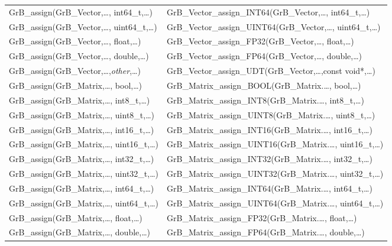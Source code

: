\begin{table}[htb]
{\begin{tabular}{l|l}
{\sf GrB\_assign(GrB\_Vector,\ldots, int64\_t,\ldots)}		& {\sf GrB\_Vector\_assign\_INT64(GrB\_Vector,\ldots, int64\_t,\ldots)} \\
{\sf GrB\_assign(GrB\_Vector,\ldots, uint64\_t,\ldots)}		& {\sf GrB\_Vector\_assign\_UINT64(GrB\_Vector,\ldots, uint64\_t,\ldots)} \\
{\sf GrB\_assign(GrB\_Vector,\ldots, float,\ldots)}		& {\sf GrB\_Vector\_assign\_FP32(GrB\_Vector,\ldots, float,\ldots)} \\
{\sf GrB\_assign(GrB\_Vector,\ldots, double,\ldots)}		& {\sf GrB\_Vector\_assign\_FP64(GrB\_Vector,\ldots, double,\ldots)} \\
{\sf GrB\_assign(GrB\_Vector,\ldots,\emph{other},\ldots)}	& {\sf GrB\_Vector\_assign\_UDT(GrB\_Vector,\ldots,const void*,\ldots)} \\ \hline
{\sf GrB\_assign(GrB\_Matrix,\ldots, bool,\ldots)}		& {\sf GrB\_Matrix\_assign\_BOOL(GrB\_Matrix.\ldots, bool,\ldots)} \\
{\sf GrB\_assign(GrB\_Matrix,\ldots, int8\_t,\ldots)}		& {\sf GrB\_Matrix\_assign\_INT8(GrB\_Matrix.\ldots, int8\_t,\ldots)} \\
{\sf GrB\_assign(GrB\_Matrix,\ldots, uint8\_t,\ldots)}		& {\sf GrB\_Matrix\_assign\_UINT8(GrB\_Matrix.\ldots, uint8\_t,\ldots)} \\
{\sf GrB\_assign(GrB\_Matrix,\ldots, int16\_t,\ldots)}		& {\sf GrB\_Matrix\_assign\_INT16(GrB\_Matrix.\ldots, int16\_t,\ldots)} \\
{\sf GrB\_assign(GrB\_Matrix,\ldots, uint16\_t,\ldots)}		& {\sf GrB\_Matrix\_assign\_UINT16(GrB\_Matrix.\ldots, uint16\_t,\ldots)} \\
{\sf GrB\_assign(GrB\_Matrix,\ldots, int32\_t,\ldots)}		& {\sf GrB\_Matrix\_assign\_INT32(GrB\_Matrix.\ldots, int32\_t,\ldots)} \\
{\sf GrB\_assign(GrB\_Matrix,\ldots, uint32\_t,\ldots)}		& {\sf GrB\_Matrix\_assign\_UINT32(GrB\_Matrix.\ldots, uint32\_t,\ldots)} \\
{\sf GrB\_assign(GrB\_Matrix,\ldots, int64\_t,\ldots)}		& {\sf GrB\_Matrix\_assign\_INT64(GrB\_Matrix.\ldots, int64\_t,\ldots)} \\
{\sf GrB\_assign(GrB\_Matrix,\ldots, uint64\_t,\ldots)}		& {\sf GrB\_Matrix\_assign\_UINT64(GrB\_Matrix.\ldots, uint64\_t,\ldots)} \\
{\sf GrB\_assign(GrB\_Matrix,\ldots, float,\ldots)}		& {\sf GrB\_Matrix\_assign\_FP32(GrB\_Matrix.\ldots, float,\ldots)} \\
{\sf GrB\_assign(GrB\_Matrix,\ldots, double,\ldots)}		& {\sf GrB\_Matrix\_assign\_FP64(GrB\_Matrix.\ldots, double,\ldots)} \\

\end{tabular}}
\end{table}
